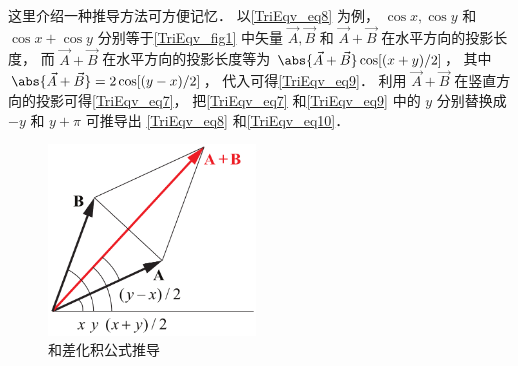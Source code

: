 这里介绍一种推导方法可方便记忆． 以\autoref{TriEqv_eq8} 为例， $\cos x, \cos y$ 和 $\cos x + \cos y$ 分别等于\autoref{TriEqv_fig1} 中矢量 $\vec A, \vec B$ 和 $\vec A + \vec B$ 在水平方向的投影长度， 而 $\vec A + \vec B$ 在水平方向的投影长度等为 $\abs{\vec A + \vec B}\cos[(x+y)/2]$， 其中 $\abs{\vec A + \vec B} = 2\cos [(y-x)/2]$， 代入可得\autoref{TriEqv_eq9}． 利用 $\vec A + \vec B$ 在竖直方向的投影可得\autoref{TriEqv_eq7}， 把\autoref{TriEqv_eq7} 和\autoref{TriEqv_eq9} 中的 $y$ 分别替换成 $-y$ 和 $y+\pi$ 可推导出 \autoref{TriEqv_eq8} 和\autoref{TriEqv_eq10}．
\begin{figure}[ht]
\centering
\includegraphics[width=5.5cm]{./figures/TriEqv.pdf}
\caption{和差化积公式推导} \label{TriEqv_fig1}
\end{figure}